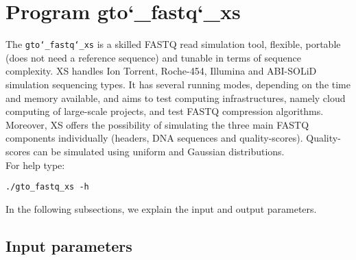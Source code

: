 \section{Program gto\char`_fastq\char`_xs}
The \texttt{gto\char`_fastq\char`_xs} is a skilled FASTQ read simulation tool, flexible, portable (does not need a reference sequence) and tunable in terms of sequence complexity. XS handles Ion Torrent, Roche-454, Illumina and ABI-SOLiD simulation sequencing types. It has several running modes, depending on the time and memory available, and aims to test computing infrastructures, namely cloud computing of large-scale projects, and test FASTQ compression algorithms. Moreover, XS offers the possibility of simulating the three main FASTQ components individually (headers, DNA sequences and quality-scores). Quality-scores can be simulated using uniform and Gaussian distributions.\\
For help type:
\begin{lstlisting}
./gto_fastq_xs -h
\end{lstlisting}
In the following subsections, we explain the input and output parameters.

\subsection*{Input parameters}

